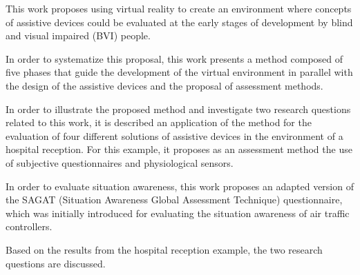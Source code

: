 



This work proposes using virtual reality to create an environment where concepts of assistive devices could be evaluated at the early stages of development by blind and visual impaired (BVI) people.

In order to systematize this proposal, this work presents a method composed of five phases that guide the development of the virtual environment in parallel with the design of the assistive devices and the proposal of assessment methods.

In order to illustrate the proposed method and investigate two research questions related to this work, it is described an application of the method for the evaluation of four different solutions of assistive devices in the environment of a hospital reception. For this example, it proposes as an assessment method the use of subjective questionnaires and physiological sensors. 

In order to evaluate situation awareness, this work proposes an adapted version of the SAGAT (Situation Awareness Global Assessment Technique) questionnaire, which was initially introduced for evaluating the situation awareness of air traffic controllers. 

Based on the results from the hospital reception example, the two research questions are discussed.

